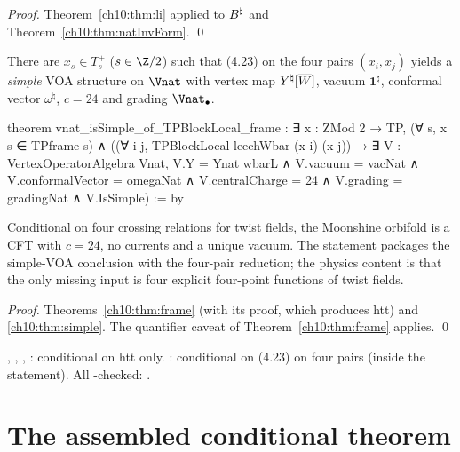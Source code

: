 \emph{Proof.} Theorem~\ref{ch10:thm:li} applied to $B^{\natural}$ and Theorem~\ref{ch10:thm:natInvForm}. \qed

\begin{theorem}\label{ch10:thm:simpleframe}
There are $x_s\in T_s^+$ ($s\in\Z/2$) such that (4.23) on the four pairs $(x_i,x_j)$ yields a
\emph{simple} VOA structure on $\Vnat$ with vertex map $Y^\natural[\overline{W}]$, vacuum
$\mathbf 1^\natural$, conformal vector $\omega^\natural$, $c=24$ and grading $\Vnat_\bullet$.
\end{theorem}
\begin{leancode}
theorem vnat_isSimple_of_TPBlockLocal_frame :
    ∃ x : ZMod 2 → TP, (∀ s, x s ∈ TPframe s) ∧
      ((∀ i j, TPBlockLocal leechWbar (x i) (x j)) →
        ∃ V : VertexOperatorAlgebra Vnat,
          V.Y = Ynat wbarL ∧ V.vacuum = vacNat ∧ V.conformalVector = omegaNat ∧
            V.centralCharge = 24 ∧ V.grading = gradingNat ∧ V.IsSimple) := by
\end{leancode}

\begin{physics}
Conditional on four crossing relations for twist fields, the Moonshine orbifold is a CFT with $c=24$, no currents and a unique vacuum. The statement packages the simple-VOA conclusion with the four-pair reduction; the physics content is that the only missing input is four explicit four-point functions of twist fields.
\end{physics}

\emph{Proof.} Theorems~\ref{ch10:thm:frame} (with its proof, which produces htt) and
\ref{ch10:thm:simple}.  The quantifier caveat of Theorem~\ref{ch10:thm:frame} applies. \qed

\begin{status}
, , ,
: conditional on htt only.
: conditional on (4.23) on four pairs (inside the
statement).  All -checked: .
\end{status}

\section{The assembled conditional theorem}\label{ch10:sec:assembly}


